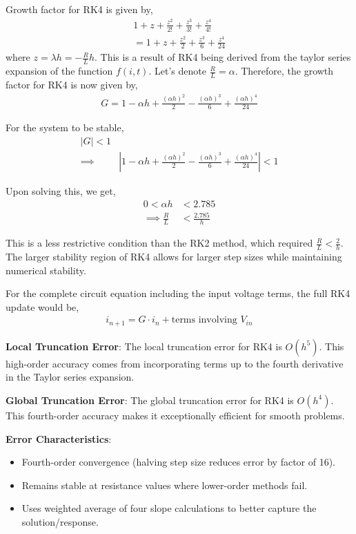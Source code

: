 \documentclass[12pt]{article}
\newcommand{\brak}[1]{\ensuremath{\left(#1\right)}}
\newcommand{\abs}[1]{\left\vert#1\right\vert}
\begin{document}
Growth factor for RK4 is given by,
\begin{align*}
    1 + z + \frac{z^2}{2!} + \frac{z^3}{3!} + \frac{z^4}{4!}\\
    = 1 + z + \frac{z^2}{2} + \frac{z^3}{6} + \frac{z^4}{24}
\end{align*}
where $z = \lambda h = -\frac{R}{L}h$. \newline
This is a result of RK4 being derived from the taylor series expansion of the function $f\brak{i, t}$.\newline\newline
Let's denote $\frac{R}{L} = \alpha$. Therefore, the growth factor for RK4 is now given by,
\begin{align*}
G = 1 - \alpha h + \frac{(\alpha h)^2}{2} - \frac{(\alpha h)^3}{6} + \frac{(\alpha h)^4}{24}
\end{align*}

For the system to be stable,
\begin{align*}
    \abs{G} < 1\\
    \implies &\abs{1 - \alpha h + \frac{(\alpha h)^2}{2} - \frac{(\alpha h)^3}{6} + \frac{(\alpha h)^4}{24}} < 1
\end{align*}

Upon solving this, we get,
\begin{align*}
0 < \alpha h &< 2.785\\
\implies \frac{R}{L} &< \frac{2.785}{h}
\end{align*}

This is a less restrictive condition than the RK2 method, which required $\frac{R}{L} < \frac{2}{h}$. The larger stability region of RK4 allows for larger step sizes while maintaining numerical stability.

For the complete circuit equation including the input voltage terms, the full RK4 update would be,
\begin{align*}
i_{n+1} = G \cdot i_n + \text{terms involving } V_{in}
\end{align*}

\textbf{Local Truncation Error}: The local truncation error for RK4 is $O(h^5)$. This high-order accuracy comes from incorporating terms up to the fourth derivative in the Taylor series expansion.

\textbf{Global Truncation Error}: The global truncation error for RK4 is $O(h^4)$. This fourth-order accuracy makes it exceptionally efficient for smooth problems.

\textbf{Error Characteristics}:
\begin{itemize}
\item Fourth-order convergence (halving step size reduces error by factor of 16).
\item Remains stable at resistance values where lower-order methods fail.
\item Uses weighted average of four slope calculations to better capture the solution/response.
\end{itemize}
\end{document}
